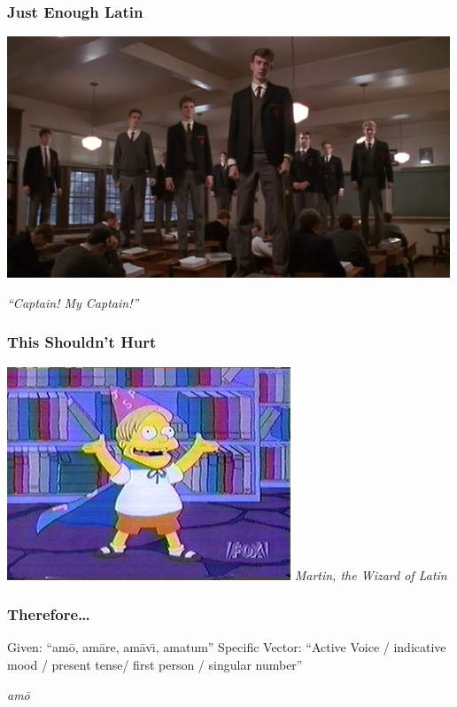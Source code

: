 \documentclass[slidestop,compress,mathserif]{beamer}
\begin{document}
\begin{frame}
	\frametitle{Just Enough Latin}
	\vskip 0.5cm
	\begin{center}
		\includegraphics[scale=0.45]{img/captain.jpg}
	\end{center}
	
	\vskip 0.5cm
	\begin{center}
		\emph{``Captain!  My Captain!''}
	\end{center}
\end{frame}

\begin{frame}
	\frametitle{This Shouldn't Hurt}
	\begin{center}
		\includegraphics[scale=0.45]{img/MartinWizard.jpg}
		\vskip 0.5cm
		\emph{Martin, the Wizard of Latin}
	\end{center}			
\end{frame}

\begin{frame}
	\frametitle{Therefore\ldots}
	Given:  ``am\={o}, am\={a}re, am\={a}v\={\i}, amatum''
	\vskip 0.5cm
	Specific Vector: ``Active Voice / indicative mood / present tense/ first person / singular number'' 
	\vskip 0.5cm
	\begin{center}
		\emph{am\={o}}
	\end{center}
\end{frame}
\end{document}
